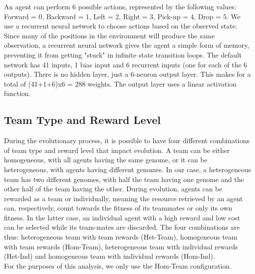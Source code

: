 \documentclass[12pt]{article}
\begin{document}
\begin{appendices}
An agent can perform 6 possible actions, represented by the following values: Forward = 0, Backward = 1, Left = 2, Right = 3, Pick-up = 4, Drop = 5.
We use a recurrent neural network to choose actions based on the observed state.
Since many of the positions in the environment will produce the same observation, a recurrent neural network gives the agent a simple form of memory, preventing it from getting "stuck" in infinite state transition loops.
The default network has 41 inputs, 1 bias input and 6 recurrent inputs (one for each of the 6 outputs). 
There is no hidden layer, just a 6-neuron output layer. 
This makes for a total of (41+1+6)x6 = 288 weights. 
The output layer uses a linear activation function.

\subsection{Team Type and Reward Level}\label{rewards}

During the evolutionary process, it is possible to have four different combinations of team type and reward level that impact evolution.
A team can be either homogeneous, with all agents having the same genome, or it can be heterogeneous, with agents having different genomes.
In our case, a heterogeneous team has two different genomes, with half the team having one genome and the other half of the team having the other.
During evolution, agents can be rewarded as a team or individually, meaning the resource retrieved by an agent can, respectively, count towards the fitness of its teammates or only its own fitness.
In the latter case, an individual agent with a high reward and low cost can be selected while its team-mates are discarded. 
The four combinations are thus: heterogeneous team with team rewards (Het-Team), homogeneous team with team rewards (Hom-Team), heterogeneous team with individual rewards (Het-Ind) and homogeneous team with individual rewards (Hom-Ind).\\

For the purposes of this analysis, we only use the Hom-Team configuration.
\end{appendices}
\end{document}
